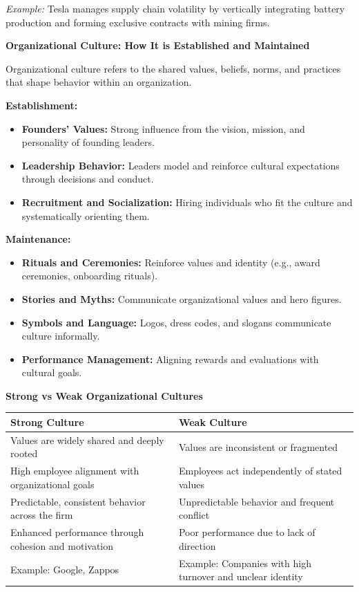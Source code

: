\documentclass[10pt,a4paper]{book}
\begin{document}
\begin{multicols}{2}
\textit{Example:} Tesla manages supply chain volatility by vertically integrating battery production and forming exclusive contracts with mining firms.

\vspace{0.5cm}

\textbf{Organizational Culture: How It is Established and Maintained}

Organizational culture refers to the shared values, beliefs, norms, and practices that shape behavior within an organization.

\textbf{Establishment:}
\begin{itemize}
    \item \textbf{Founders’ Values:} Strong influence from the vision, mission, and personality of founding leaders.
    \item \textbf{Leadership Behavior:} Leaders model and reinforce cultural expectations through decisions and conduct.
    \item \textbf{Recruitment and Socialization:} Hiring individuals who fit the culture and systematically orienting them.
\end{itemize}

\textbf{Maintenance:}
\begin{itemize}
    \item \textbf{Rituals and Ceremonies:} Reinforce values and identity (e.g., award ceremonies, onboarding rituals).
    \item \textbf{Stories and Myths:} Communicate organizational values and hero figures.
    \item \textbf{Symbols and Language:} Logos, dress codes, and slogans communicate culture informally.
    \item \textbf{Performance Management:} Aligning rewards and evaluations with cultural goals.
\end{itemize}

\end{multicols}
\vspace{0.5cm}

\textbf{Strong vs Weak Organizational Cultures}

\begin{center}
\begin{tabular}{|p{8cm}|p{8cm}|}
\hline
\textbf{Strong Culture} & \textbf{Weak Culture} \\
\hline
Values are widely shared and deeply rooted & Values are inconsistent or fragmented \\
\hline
High employee alignment with organizational goals & Employees act independently of stated values \\
\hline
Predictable, consistent behavior across the firm & Unpredictable behavior and frequent conflict \\
\hline
Enhanced performance through cohesion and motivation & Poor performance due to lack of direction \\
\hline
Example: Google, Zappos & Example: Companies with high turnover and unclear identity \\
\hline
\end{tabular}
\end{center}
\end{document}
